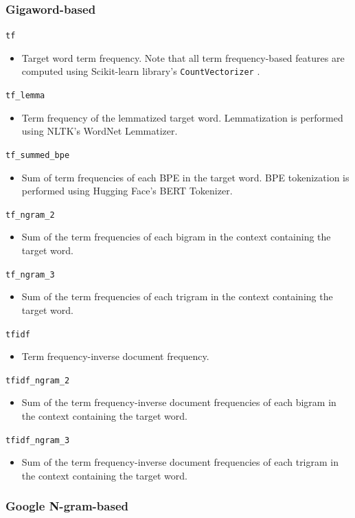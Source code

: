 \documentclass[11pt,a4paper]{article}
\begin{document}
\subsubsection{Gigaword-based}

\texttt{tf}
\begin{itemize}
  \item Target word term frequency. Note that all term frequency-based features are computed using Scikit-learn library's \texttt{CountVectorizer} \citep{scikitlearn}.
\end{itemize}
\texttt{tf\_lemma}
\begin{itemize}
  \item Term frequency of the lemmatized target word. Lemmatization is performed using NLTK's WordNet Lemmatizer.
\end{itemize}
\texttt{tf\_summed\_bpe}
\begin{itemize}
  \item Sum of term frequencies of each BPE in the target word. BPE tokenization is performed using Hugging Face's BERT Tokenizer.
\end{itemize}
\texttt{tf\_ngram\_2}
\begin{itemize}
  \item Sum of the term frequencies of each bigram in the context containing the target word.
\end{itemize}
\texttt{tf\_ngram\_3}
\begin{itemize}
  \item Sum of the term frequencies of each trigram in the context containing the target word.
\end{itemize}
\texttt{tfidf}
\begin{itemize}
  \item Term frequency-inverse document frequency.
\end{itemize}
\texttt{tfidf\_ngram\_2}
\begin{itemize}
  \item Sum of the term frequency-inverse document frequencies of each bigram in the context containing the target word.
\end{itemize}
\texttt{tfidf\_ngram\_3}
\begin{itemize}
  \item Sum of the term frequency-inverse document frequencies of each trigram in the context containing the target word.
\end{itemize}

\subsubsection{Google N-gram-based}
\end{document}
